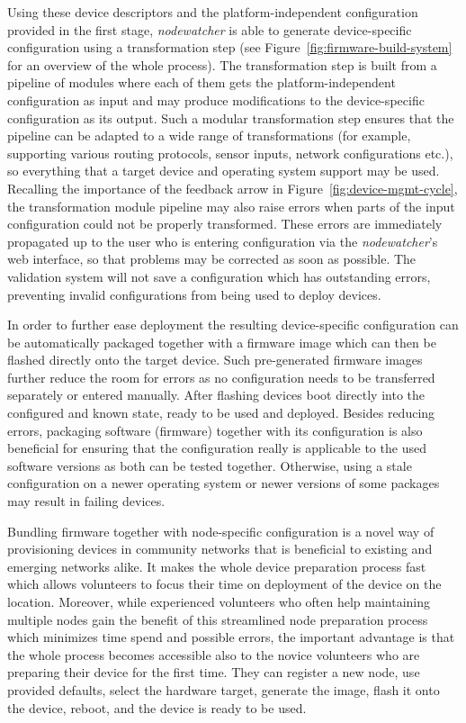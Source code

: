 \documentclass[5p,sort&compress]{elsarticle}
\newcommand{\nodewatcher}{\textit{nodewatcher}}
\begin{document}
Using these device descriptors and the platform-independent configuration provided in the first stage, \nodewatcher{} is able to generate device-specific configuration using a transformation step (see Figure~\ref{fig:firmware-build-system} for an overview of the whole process).
The transformation step is built from a pipeline of modules where each of them gets the platform-independent configuration as input and may produce modifications to the device-specific configuration as its output.
Such a modular transformation step ensures that the pipeline can be adapted to a wide range of transformations (for example, supporting various routing protocols, sensor inputs, network configurations etc.), so everything that a target device and operating system support may be used.
Recalling the importance of the feedback arrow in Figure~\ref{fig:device-mgmt-cycle}, the transformation module pipeline may also raise errors when parts of the input configuration could not be properly transformed.
These errors are immediately propagated up to the user who is entering configuration via the \nodewatcher{}'s web interface, so that problems may be corrected as soon as possible.
The validation system will not save a configuration which has outstanding errors, preventing invalid configurations from being used to deploy devices.

In order to further ease deployment the resulting device-specific configuration can be automatically packaged together with a firmware image which can then be flashed directly onto the target device.
Such pre-generated firmware images further reduce the room for errors as no configuration needs to be transferred separately or entered manually.
After flashing devices boot directly into the configured and known state, ready to be used and deployed.
Besides reducing errors, packaging software (firmware) together with its configuration is also beneficial for ensuring that the configuration really is applicable to the used software versions as both can be tested together.
Otherwise, using a stale configuration on a newer operating system or newer versions of some packages may result in failing devices.

Bundling firmware together with node-specific configuration is a novel way of provisioning devices in community networks that is beneficial to existing and emerging networks alike.
It makes the whole device preparation process fast which allows volunteers to focus their time on deployment of the device on the location.
Moreover, while experienced volunteers who often help maintaining multiple nodes gain the benefit of this streamlined node preparation process which minimizes time spend and possible errors, the important advantage is that the whole process becomes accessible also to the novice volunteers who are preparing their device for the first time.
They can register a new node, use provided defaults, select the hardware target, generate the image, flash it onto the device, reboot, and the device is ready to be used.
\end{document}
